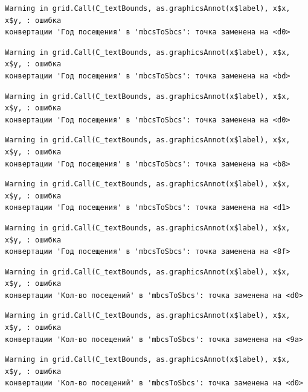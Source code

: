\documentclass[
  letterpaper,
  DIV=11,
  numbers=noendperiod]{scrreprt}
\begin{document}
\begin{verbatim}
Warning in grid.Call(C_textBounds, as.graphicsAnnot(x$label), x$x, x$y, : ошибка
конвертации 'Год посещения' в 'mbcsToSbcs': точка заменена на <d0>
\end{verbatim}

\begin{verbatim}
Warning in grid.Call(C_textBounds, as.graphicsAnnot(x$label), x$x, x$y, : ошибка
конвертации 'Год посещения' в 'mbcsToSbcs': точка заменена на <bd>
\end{verbatim}

\begin{verbatim}
Warning in grid.Call(C_textBounds, as.graphicsAnnot(x$label), x$x, x$y, : ошибка
конвертации 'Год посещения' в 'mbcsToSbcs': точка заменена на <d0>
\end{verbatim}

\begin{verbatim}
Warning in grid.Call(C_textBounds, as.graphicsAnnot(x$label), x$x, x$y, : ошибка
конвертации 'Год посещения' в 'mbcsToSbcs': точка заменена на <b8>
\end{verbatim}

\begin{verbatim}
Warning in grid.Call(C_textBounds, as.graphicsAnnot(x$label), x$x, x$y, : ошибка
конвертации 'Год посещения' в 'mbcsToSbcs': точка заменена на <d1>
\end{verbatim}

\begin{verbatim}
Warning in grid.Call(C_textBounds, as.graphicsAnnot(x$label), x$x, x$y, : ошибка
конвертации 'Год посещения' в 'mbcsToSbcs': точка заменена на <8f>
\end{verbatim}

\begin{verbatim}
Warning in grid.Call(C_textBounds, as.graphicsAnnot(x$label), x$x, x$y, : ошибка
конвертации 'Кол-во посещений' в 'mbcsToSbcs': точка заменена на <d0>
\end{verbatim}

\begin{verbatim}
Warning in grid.Call(C_textBounds, as.graphicsAnnot(x$label), x$x, x$y, : ошибка
конвертации 'Кол-во посещений' в 'mbcsToSbcs': точка заменена на <9a>
\end{verbatim}

\begin{verbatim}
Warning in grid.Call(C_textBounds, as.graphicsAnnot(x$label), x$x, x$y, : ошибка
конвертации 'Кол-во посещений' в 'mbcsToSbcs': точка заменена на <d0>
\end{verbatim}
\end{document}
